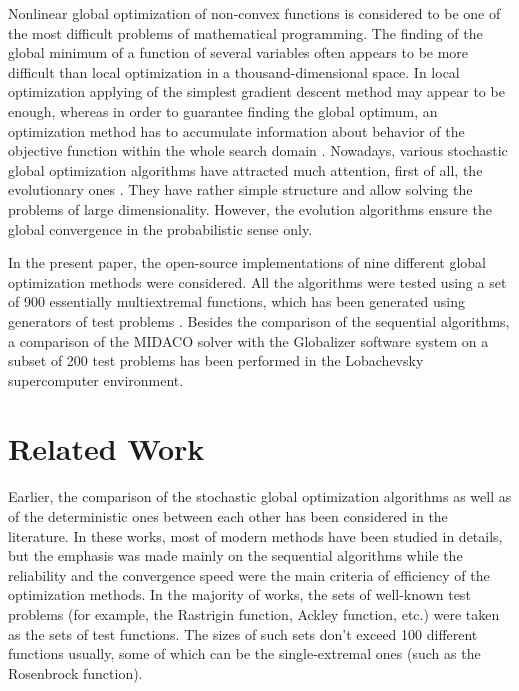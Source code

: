\documentclass{svproc}
\begin{document}
Nonlinear global optimization of non-convex functions is considered to be one of the most
difficult problems of mathematical programming. The finding of the global minimum of
a function of several variables often appears to be more difficult than local optimization in a
thousand-dimensional space. In local optimization applying of the simplest gradient descent
method may appear to be enough, whereas in order to guarantee finding the global
optimum, an optimization method has to accumulate information about behavior of the
objective function within the whole search domain
\cite{Jones2009,Paulavicius2011,Evtushenko2013,Strongin2000}. Nowadays, various stochastic global
optimization algorithms have attracted much attention, first of all, the evolutionary ones
\cite{Storn1997, SCHLUTER2009, KennedyEberhart1995}. They have rather simple structure
and allow solving the problems of large dimensionality. However, the evolution algorithms ensure
the global convergence in the probabilistic sense only.

In the present paper, the open-source implementations of nine different global optimization methods
were considered. All the algorithms were tested using a set of 900 essentially multiextremal functions,
which has been generated using generators of test problems \cite{Gaviano2003, grishaginClass}.
Besides the comparison of the sequential algorithms, a comparison of the MIDACO solver
\cite{Schlueter2012} with the Globalizer software system \cite{globalizerSystem,Strongin2018} on a subset of 200 test problems has been
performed in the Lobachevsky supercomputer environment.


\section{Related Work}

Earlier, the comparison of the stochastic global optimization algorithms \cite{Ali2005, JSSv060i06}
as well as of the deterministic ones \cite{posik2012, Kvasov2018, Liberti2005} between each
other has been considered in the literature. In these works, most of modern methods have
been studied in details, but the emphasis was made mainly on the sequential algorithms while the
reliability and the convergence speed were the main criteria of efficiency of the optimization
methods. In the majority of works, the sets of well-known test problems (for example, the Rastrigin
function, Ackley function, etc.) were taken as the sets of test functions. The sizes of such sets don't
exceed 100 different functions usually, some of which can be the single-extremal ones (such as the
Rosenbrock function).
\end{document}
